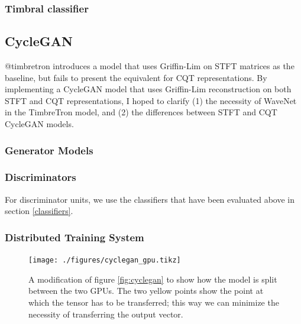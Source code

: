 \documentclass[]{report}
\begin{document}
\hypertarget{timbral-classifier}{%
\subsubsection{Timbral classifier}\label{timbral-classifier}}

\hypertarget{cyclegan-1}{%
\subsection{CycleGAN}\label{cyclegan-1}}

@timbretron introduces a model that uses Griffin-Lim on STFT matrices as
the baseline, but fails to present the equivalent for CQT
representations. By implementing a CycleGAN model that uses Griffin-Lim
reconstruction on both STFT and CQT representations, I hoped to clarify
(1) the necessity of WaveNet in the TimbreTron model, and (2) the
differences between STFT and CQT CycleGAN models.

\hypertarget{generator-models}{%
\subsubsection{Generator Models}\label{generator-models}}

\hypertarget{discriminators}{%
\subsubsection{Discriminators}\label{discriminators}}

For discriminator units, we use the classifiers that have been evaluated
above in section \ref{classifiers}.

\hypertarget{distributed-training-system}{%
\subsubsection{Distributed Training
System}\label{distributed-training-system}}

\begin{figure}[h]
    \texttt{[image: ./figures/cyclegan\_gpu.tikz]}
    \centering
    \caption{A modification of figure \ref{fig:cyclegan} to show how the model is split between the two GPUs. The two yellow points show the point at which the tensor has to be transferred; this way we can minimize the necessity of transferring the output vector.} \label{fig:cyclegan_gpu}
\end{figure}
\end{document}
